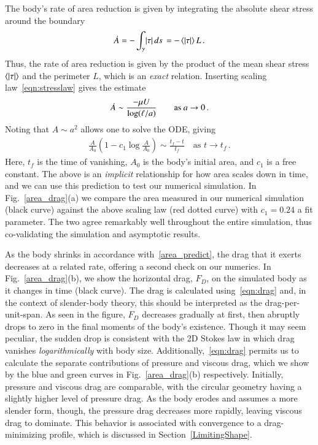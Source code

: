 \documentclass[preprint, 10pt]{elsarticle}
\begin{document}
The body's rate of area reduction is given by integrating the absolute shear stress around the boundary
\begin{align}
\dot{A} = - \int_{\gamma} \lvert \tau \rvert \, ds \,  = - \left< \lvert \tau \rvert \right> L \, .
\end{align}
Thus, the rate of area reduction is given by the product of the mean shear stress $\left< \lvert \tau \rvert \right>$ and the perimeter $L$, which is an {\em exact} relation. Inserting scaling law~\eqref{eqn:stresslaw} gives the estimate
\begin{align}
\dot{A} \sim \frac{ - \mu U}{\log(\ell/a)} \qquad \text{as } a \to 0 \, . 
\end{align}
Noting that $A \sim a^2$ allows one to solve the ODE, giving
\begin{align}
\label{area_predict}
\frac{A}{A_0} \left( 1 - c_1 \log{\frac{A}{A_0}} \right) \sim \frac{t_f - t}{t_f} \quad \text{as } t \to t_f \, .
\end{align}
Here, $t_f$ is the time of vanishing, $A_0$ is the body's initial area, and $c_1$ is a free constant. The above is an {\em implicit} relationship for how area scales down in time, and we can use this prediction to test our numerical simulation. In Fig.~\ref{area_drag}(a) we compare the area measured in our numerical simulation (black curve) against the above scaling law (red dotted curve) with $c_1 = 0.24$ a fit parameter. The two agree remarkably well throughout the entire simulation, thus co-validating the simulation and asymptotic results.

As the body shrinks in accordance with~\eqref{area_predict}, the drag that it exerts decreases at a related rate, offering a second check on our numerics. In Fig.~\ref{area_drag}(b), we show the horizontal drag, $F_D$, on the simulated body as it changes in time (black curve). The drag is calculated using~\eqref{eqn:drag} and, in the context of slender-body theory, this should be interpreted as the drag-per-unit-span. As seen in the figure, $F_D$ decreases gradually at first, then abruptly drops to zero in the final moments of the body's existence. Though it may seem peculiar, the sudden drop is consistent with the 2D Stokes law in which drag vanishes {\em logarithmically} with body size. Additionally,~\eqref{eqn:drag} permits us to calculate the separate contributions of pressure and viscous drag, which we show by the blue and green curves in Fig.~\ref{area_drag}(b) respectively. Initially, pressure and viscous drag are comparable, with the circular geometry having a slightly higher level of pressure drag. As the body erodes and assumes a more slender form, though, the pressure drag decreases more rapidly, leaving viscous drag to dominate. This behavior is associated with convergence to a drag-minimizing profile, which is discussed in Section~\ref{LimitingShape}.
\end{document}
